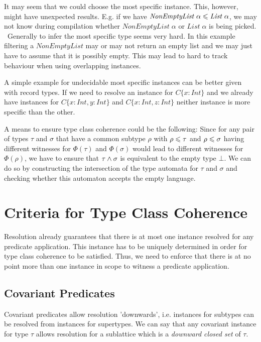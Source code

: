   It may seem that we could choose the most specific instance. This, however, might have unexpected results.
  E.g. if we have $\mathit{NonEmptyList} \; \alpha \leqslant \mathit{List} \; \alpha$, we may not know during compilation whether $\mathit{NonEmptyList} \; \alpha $ or $\mathit{List} \; \alpha$ is being picked.
  ~Generally to infer the most specific type seems very hard. In this example filtering a $\mathit{NonEmptyList}$ may or may not return an empty list and we may just have to assume that it is possibly empty.
  This may lead to hard to track behaviour when using overlapping instances.

A simple example for undecidable most specific instances can be better given with record types.
If we need to resolve an instance for $C \{x : Int\}$ and we already have instances for $C \{x : Int, y : Int\}$ and $C \{x : Int, z : Int\}$ neither instance is more specific than the other.


A means to ensure type class coherence could be the following:
Since for any pair of types $\tau$ and $\sigma$ that have a common subtype $\rho$ with $\rho \leqslant \tau$ and $\rho \leqslant \sigma$ having different witnesses for $\Phi(\tau)$ and $\Phi(\sigma)$ would lead to different witnesses for $\Phi(\rho)$,
we have to ensure that $\tau \wedge \sigma$ is equivalent to the empty type $\bot$.
We can do so by constructing the intersection of the type automata for $\tau$ and $\sigma$ and checking whether this automaton accepts the empty language.


\section{Criteria for Type Class Coherence}

Resolution already guarantees that there is at most one instance resolved for any predicate application.
This instance has to be uniquely determined in order for type class coherence to be satisfied.
Thus, we need to enforce that there is at no point more than one instance in scope to witness a predicate application.

\subsection{Covariant Predicates}

Covariant predicates allow resolution 'downwards', i.e. instances for subtypes can be resolved from instances for supertypes.
We can say that any covariant instance for type $\tau$ allows resolution for a sublattice which is a \emph{downward closed set} of $\tau$. 

